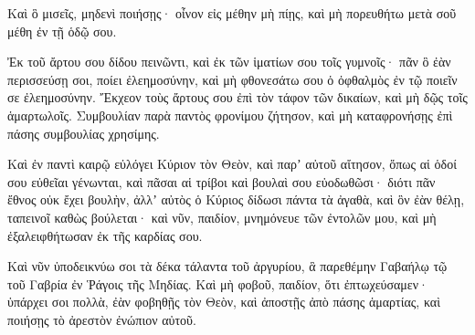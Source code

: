 {Καὶ ὃ μισεῖς, μηδενὶ ποιήσῃς· οἶνον εἰς μέθην μὴ πίῃς, καὶ μὴ πορευθήτω μετὰ σοῦ μέθη ἐν τῇ ὁδῷ σου.
\par }{\PP {}Ἐκ τοῦ ἄρτου σου δίδου πεινῶντι, καὶ ἐκ τῶν ἱματίων σου τοῖς γυμνοῖς· πᾶν ὃ ἐὰν περισσεύσῃ σοι, ποίει ἐλεημοσύνην, καὶ μὴ φθονεσάτω σου ὁ ὀφθαλμὸς ἐν τῷ ποιεῖν σε ἐλεημοσύνην.
Ἔκχεον τοὺς ἄρτους σου ἐπὶ τὸν τάφον τῶν δικαίων, καὶ μὴ δῷς τοῖς ἁμαρτωλοῖς.
Συμβουλίαν παρὰ παντὸς φρονίμου ζήτησον, καὶ μὴ καταφρονήσῃς ἐπὶ πάσης συμβουλίας χρησίμης.
\par }{\PP {}Καὶ ἐν παντὶ καιρῷ εὐλόγει Κύριον τὸν Θεὸν, καὶ παρʼ αὐτοῦ αἴτησον, ὅπως αἱ ὁδοί σου εὐθεῖαι γένωνται, καὶ πᾶσαι αἱ τρίβοι καὶ βουλαὶ σου εὐοδωθῶσι· διότι πᾶν ἔθνος οὐκ ἔχει βουλὴν, ἀλλʼ αὐτὸς ὁ Κύριος δίδωσι πάντα τὰ ἀγαθὰ, καὶ ὃν ἐὰν θέλῃ, ταπεινοῖ καθὼς βούλεται· καὶ νῦν, παιδίον, μνημόνευε τῶν ἐντολῶν μου, καὶ μὴ ἐξαλειφθήτωσαν ἐκ τῆς καρδίας σου.
\par }{\PP {}Καὶ νῦν ὑποδεικνύω σοι τὰ δέκα τάλαντα τοῦ ἀργυρίου, ἃ παρεθέμην Γαβαήλῳ τῷ τοῦ Γαβρία ἐν Ῥάγοις τῆς Μηδίας.
Καὶ μὴ φοβοῦ, παιδίον, ὅτι ἐπτωχεύσαμεν· ὑπάρχει σοι πολλὰ, ἐὰν φοβηθῇς τὸν Θεὸν, καὶ ἀποστῇς ἀπὸ πάσης ἁμαρτίας, καὶ ποιήσῃς τὸ ἀρεστὸν ἐνώπιον αὐτοῦ.

}
